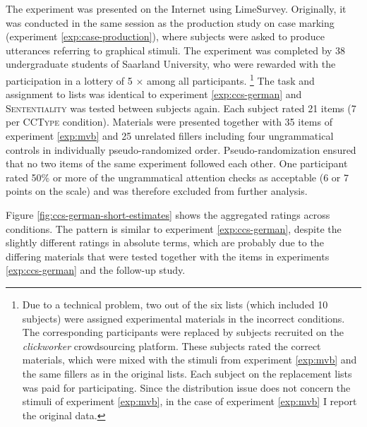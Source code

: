 The experiment was presented on the Internet using Lime\-Survey. Originally, it was conducted in the same session as the production study on case marking (experiment \ref{exp:case-production}), where subjects were asked to produce utterances referring to graphical stimuli. The experiment was completed by 38 undergraduate students of Saarland University, who were rewarded with the participation in a lottery of 5 $\times$  among all participants.%
%
\footnote{Due to a technical problem, two out of the six lists (which included 10 subjects) were assigned experimental materials in the incorrect conditions. The corresponding participants were replaced by subjects recruited on the \textit{clickworker} crowdsourcing platform. These subjects rated the correct materials, which were mixed with the stimuli from experiment \ref{exp:mvb} and the same fillers as in the original lists. Each subject on the replacement lists was paid  for participating. Since the distribution issue does not concern the stimuli of experiment \ref{exp:mvb}, in the case of experiment \ref{exp:mvb} I report the original data.}\afterfn%
%
The task and assignment to lists was identical to experiment \ref{exp:ccs-german} and \textsc{Sententiality} was tested between subjects again. Each subject rated 21 items (7 per \textsc{CCType} condition). Materials were presented together with 35 items of experiment \ref{exp:mvb} and 25 unrelated fillers including four ungrammatical controls in individually pseudo-randomized order. Pseudo-randomization ensured that no two items of the same experiment followed each other. One participant rated 50\% or more of the ungrammatical attention checks as acceptable (6 or 7 points on the scale) and was therefore excluded from further analysis.

Figure \ref{fig:ccs-german-short-estimates} shows the aggregated ratings across conditions. The pattern is similar to experiment \ref{exp:ccs-german}, despite the slightly different ratings in absolute terms, which are probably due to the differing materials that were tested together with the items in experiments \ref{exp:ccs-german} and the follow-up study.

